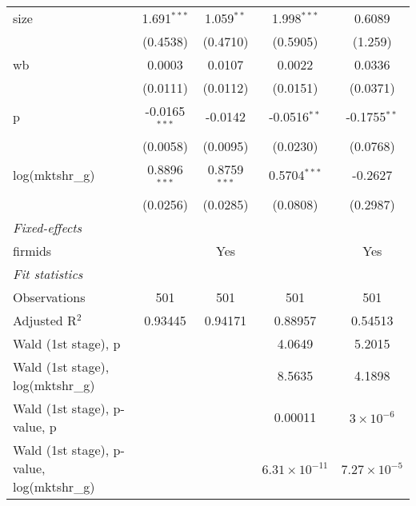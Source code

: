 \begin{table}[htbp]
\begin{tabular}{lcccc}
      size                                       & 1.691$^{***}$   & 1.059$^{**}$           & 1.998$^{***}$          & 0.6089\\   
                                                 & (0.4538)        & (0.4710)               & (0.5905)               & (1.259)\\   
      wb                                         & 0.0003          & 0.0107                 & 0.0022                 & 0.0336\\   
                                                 & (0.0111)        & (0.0112)               & (0.0151)               & (0.0371)\\   
      p                                          & -0.0165$^{***}$ & -0.0142                & -0.0516$^{**}$         & -0.1755$^{**}$\\   
                                                 & (0.0058)        & (0.0095)               & (0.0230)               & (0.0768)\\   
      log(mktshr\_g)                             & 0.8896$^{***}$  & 0.8759$^{***}$         & 0.5704$^{***}$         & -0.2627\\   
                                                 & (0.0256)        & (0.0285)               & (0.0808)               & (0.2987)\\   
      \midrule
      \emph{Fixed-effects}\\
      firmids                                    &                 & Yes                    &                        & Yes\\  
      \midrule
      \emph{Fit statistics}\\
      Observations                               & 501             & 501                    & 501                    & 501\\  
      Adjusted R$^2$                             & 0.93445         & 0.94171                & 0.88957                & 0.54513\\  
      Wald (1st stage), p                        &                 &                        & 4.0649                 & 5.2015\\  
      Wald (1st stage), log(mktshr\_g)           &                 &                        & 8.5635                 & 4.1898\\  
      Wald (1st stage), p-value, p               &                 &                        & 0.00011                & $3\times 10^{-6}$\\   
      Wald (1st stage), p-value, log(mktshr\_g)  &                 &                        & $6.31\times 10^{-11}$  & $7.27\times 10^{-5}$\\   

\end{tabular}
\end{table}

